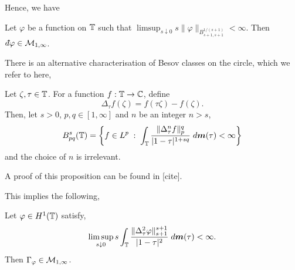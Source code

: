 Hence, we have
\begin{proposition}
    Let $\varphi$ be a function on $\mathbb{T}$ such that $\limsup_{s \downarrow 0} s\|\varphi\|_{B_{s+1,s+1}^{1/(s+1)}} < \infty$.
    Then $\qd \varphi \in \M_{1,\infty}$.
\end{proposition}


There is an alternative characterisation of Besov
classes on the circle, which we refer to here,
\begin{proposition}
\label{altBesov}
    Let $\zeta,\tau \in \mathbb{T}$. For a function
    $f:\mathbb{T}\to\mathbb{C}$, define
    \begin{equation}
        \Delta_\tau f(\zeta) = f(\tau\zeta)-f(\zeta).
    \end{equation}
    Then, let $s > 0$, $p,q \in [1,\infty]$ and $n$ be an integer $n > s$,
    \begin{equation}
        B_{pq}^s(\mathbb{T}) = \left\{f \in L^p\;:\;\int_{\mathbb{T}} \frac{\|\Delta^n_\tau f\|_p^q}{|1-\tau|^{1+sq}}\;d\boldsymbol{m}(\tau) < \infty\right\}
    \end{equation}
    and the choice of $n$ is irrelevant.
\end{proposition}
A proof of this proposition can be found in [cite].

This implies the following,
\begin{proposition}
    Let $\varphi \in H^1(\mathbb{T})$ satisfy,
    \begin{equation}
        \limsup_{s\downarrow 0} s\int_{\mathbb{T}}\frac{\|\Delta^2_\tau \varphi\|_{s+1}^{s+1}}{|1-\tau|^2}\;d\boldsymbol{m}(\tau) < \infty.
    \end{equation}
    Then $\Gamma_\varphi \in \mathcal{M}_{1,\infty}$.
\end{proposition}



